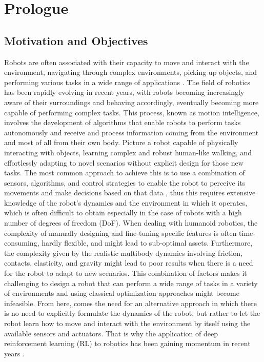 \chapter*{Prologue}
\label{chp:00-Prologue}

\section*{Motivation and Objectives}

Robots are often associated with their capacity to move and interact with the environment, navigating through complex environments, picking up objects, and performing various tasks in a wide range of applications \citep{article,zeng_robotic_2022}. The field of robotics has been rapidly evolving in recent years, with robots becoming increasingly aware of their surroundings and behaving accordingly, eventually becoming more capable of performing complex tasks. This process, known as motion intelligence, involves the development of algorithms that enable robots to perform tasks autonomously and receive and process information coming from the environment and most of all from their own body. Picture a robot capable of physically interacting with objects, learning complex and robust human-like walking, and effortlessly adapting to novel scenarios without explicit design for those new tasks.
The most common approach to achieve this is to use a combination of sensors, algorithms, and control strategies to enable the robot to perceive its movements and make decisions based on that data \citep{lara_embodied_2018, vaisi_review_2022}, thus this requires extensive knowledge of the robot's dynamics and the environment in which it operates, which is often difficult to obtain especially in the case of robots with a high number of degrees of freedom (\ac{DoF}).
When dealing with humanoid robotics, the complexity of manually designing and fine-tuning specific features is often time-consuming, hardly flexible, and might lead to sub-optimal assets. Furthermore, the complexity given by the realistic multibody dynamics involving friction, contacts, elasticity, and gravity might lead to poor results when there is a need for the robot to adapt to new scenarios. This combination of factors makes it challenging to design a robot that can perform a wide range of tasks in a variety of environments and using classical optimization approaches might become infeasible. From here, comes the need for an alternative approach in which there is no need to explicitly formulate the dynamics of the robot, but rather to let the robot learn how to move and interact with the environment by itself using the available sensors and actuators. That is why the application of deep reinforcement learning (\ac{RL}) to robotics has been gaining momentum in recent years \citep{golroudbari_recent_2023,li_reinforcement_2021}.

